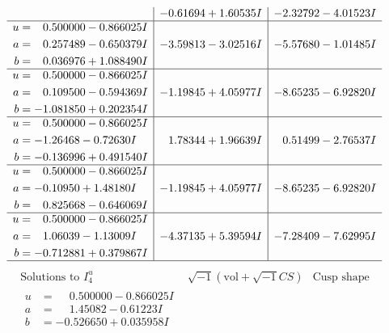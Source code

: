 \documentclass[1p]{elsarticle_modified}
\theoremstyle{definition}
\newcommand{\I}{\sqrt{-1}}
\begin{document}
$$\begin{array}{c|c|c}
 & -0.61694 + 1.60535 I & -2.32792 - 4.01523 I \\ \hline\begin{aligned}
u &= \phantom{-}0.500000 - 0.866025 I \\
a &= \phantom{-}0.257489 - 0.650379 I \\
b &= \phantom{-}0.036976 + 1.088490 I\end{aligned}
 & -3.59813 - 3.02516 I & -5.57680 - 1.01485 I \\ \hline\begin{aligned}
u &= \phantom{-}0.500000 - 0.866025 I \\
a &= \phantom{-}0.109500 - 0.594369 I \\
b &= -1.081850 + 0.202354 I\end{aligned}
 & -1.19845 + 4.05977 I & -8.65235 - 6.92820 I \\ \hline\begin{aligned}
u &= \phantom{-}0.500000 - 0.866025 I \\
a &= -1.26468 - 0.72630 I \\
b &= -0.136996 + 0.491540 I\end{aligned}
 & \phantom{-}1.78344 + 1.96639 I & \phantom{-}0.51499 - 2.76537 I \\ \hline\begin{aligned}
u &= \phantom{-}0.500000 - 0.866025 I \\
a &= -0.10950 + 1.48180 I \\
b &= \phantom{-}0.825668 - 0.646069 I\end{aligned}
 & -1.19845 + 4.05977 I & -8.65235 - 6.92820 I \\ \hline\begin{aligned}
u &= \phantom{-}0.500000 - 0.866025 I \\
a &= \phantom{-}1.06039 - 1.13009 I \\
b &= -0.712881 + 0.379867 I\end{aligned}
 & -4.37135 + 5.39594 I & -7.28409 - 7.62995 I\\
 \hline 
 \end{array}$$\newpage$$\begin{array}{c|c|c}  
\text{Solutions to }I^u_{4}& \I (\text{vol} + \sqrt{-1}CS) & \text{Cusp shape}\\
 \hline 
\begin{aligned}
u &= \phantom{-}0.500000 - 0.866025 I \\
a &= \phantom{-}1.45082 - 0.61223 I \\
b &= -0.526650 + 0.035958 I\end{aligned}

\end{array}$$
\end{document}
